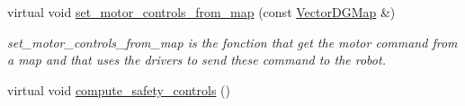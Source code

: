 \begin{DoxyCompactItemize}
virtual void \hyperlink{classdynamic__graph_1_1DynamicGraphManager_a506e6f37ac7205efaf0efe4202cde897}{set\+\_\+motor\+\_\+controls\+\_\+from\+\_\+map} (const \hyperlink{namespacedynamic__graph_a51212ed7fa4ae81e7b362a27f09b7ab8}{Vector\+D\+G\+Map} \&)
\begin{DoxyCompactList}\small\item\em set\+\_\+motor\+\_\+controls\+\_\+from\+\_\+map is the fonction that get the motor command from a map and that uses the drivers to send these command to the robot. \end{DoxyCompactList}\item 
virtual void \hyperlink{classdynamic__graph_1_1DynamicGraphManager_a60bb31040121d6041b4dd6556f5c7eac}{compute\+\_\+safety\+\_\+controls} ()\hypertarget{classdynamic__graph_1_1DynamicGraphManager_a60bb31040121d6041b4dd6556f5c7eac}{}\label{classdynamic__graph_1_1DynamicGraphManager_a60bb31040121d6041b4dd6556f5c7eac}


\end{DoxyCompactItemize}
